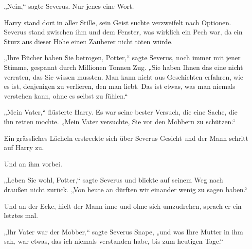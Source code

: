 „Nein,“ sagte Severus. Nur jenes eine Wort.

Harry stand dort in aller Stille, sein Geist suchte verzweifelt nach Optionen. Severus stand zwischen ihm und dem Fenster, was wirklich ein Pech war, da ein Sturz aus dieser Höhe einen Zauberer nicht töten würde.

„Ihre Bücher haben Sie betrogen, Potter,“ sagte Severus, noch immer mit jener Stimme, gespannt durch Millionen Tonnen Zug. „Sie haben Ihnen das eine nicht verraten, das Sie wissen mussten. Man kann nicht aus Geschichten erfahren, wie es ist, denjenigen zu verlieren, den man liebt. Das ist etwas, was man niemals verstehen kann, ohne es selbst zu fühlen.“

„Mein Vater,“ flüsterte Harry. Es war seine bester Versuch, die eine Sache, die ihn retten mochte. „Mein Vater versuchte, Sie vor den Mobbern zu schützen.“

Ein grässliches Lächeln erstreckte sich über Severus Gesicht und der Mann schritt auf Harry zu.

Und an ihm vorbei.

„Leben Sie wohl, Potter,“ sagte Severus und blickte auf seinem Weg nach draußen nicht zurück. „Von heute an dürften wir einander wenig zu sagen haben.“

Und an der Ecke, hielt der Mann inne und ohne sich umzudrehen, sprach er ein letztes mal.

„Ihr Vater war der Mobber,“ sagte Severus Snape, „und was Ihre Mutter in ihm sah, war etwas, das ich niemals verstanden habe, bis zum heutigen Tage.“

